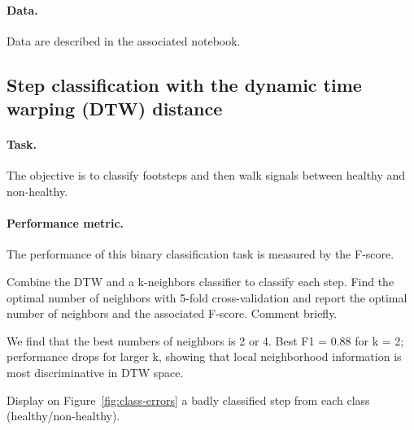 \documentclass[11pt]{article}
\begin{document}
\paragraph{Data.}
Data are described in the associated notebook.

\subsection{Step classification with the dynamic time warping (DTW) distance}

\paragraph{Task.} The objective is to classify footsteps and then walk signals between healthy and non-healthy.

\paragraph{Performance metric.} The performance of this binary classification task is measured by the F-score.


\begin{exercise}
Combine the DTW and a k-neighbors classifier to classify each step. Find the optimal number of neighbors with 5-fold cross-validation and report the optimal number of neighbors and the associated F-score. Comment briefly.
\end{exercise}

\begin{solution}
    We find that the best numbers of neighbors is 2 or 4. 
    Best F1 = 0.88 for k = 2; performance drops for larger k, showing that local neighborhood information is most discriminative in DTW space.

\end{solution}

\newpage
\begin{exercise}\label{q:class-errors}
Display on Figure~\ref{fig:class-errors} a badly classified step from each class (healthy/non-healthy).
\end{exercise}
\end{document}
